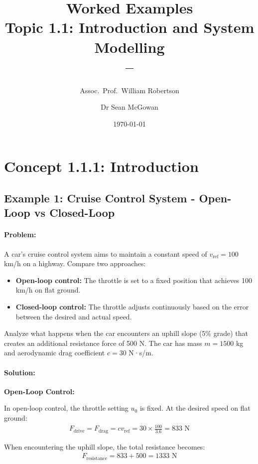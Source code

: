 \documentclass[11pt,a4paper]{article}
\title{\textbf{Worked Examples}\\[0.5em]
\large Topic 1.1: Introduction and System Modelling\\[0.3em]
\normalsize \coursesubtitle{} -- \coursetitle}
\author{Assoc.\ Prof.\ William Robertson \and Dr Sean McGowan}
\date{\today}
\begin{document}
\maketitle
\tableofcontents
\newpage

\section{Concept 1.1.1: Introduction}

\subsection{Example 1: Cruise Control System - Open-Loop vs Closed-Loop}

\paragraph{Problem:} A car's cruise control system aims to maintain a constant speed of $v_{\text{ref}} = 100$ km/h on a highway. Compare two approaches:
\begin{itemize}
\item \textbf{Open-loop control:} The throttle is set to a fixed position that achieves 100 km/h on flat ground.
\item \textbf{Closed-loop control:} The throttle adjusts continuously based on the error between the desired and actual speed.
\end{itemize}

Analyze what happens when the car encounters an uphill slope (5\% grade) that creates an additional resistance force of 500 N. The car has mass $m = 1500$ kg and aerodynamic drag coefficient $c = 30$ N·s/m.

\paragraph{Solution:}

\textbf{Open-Loop Control:}

In open-loop control, the throttle setting $u_0$ is fixed. At the desired speed on flat ground:
\begin{align}
F_{\text{drive}} = F_{\text{drag}} = cv_{\text{ref}} = 30 \times \frac{100}{3.6} = 833 \text{ N}
\end{align}

When encountering the uphill slope, the total resistance becomes:
\begin{align}
F_{\text{resistance}} = 833 + 500 = 1333 \text{ N}
\end{align}
\end{document}

